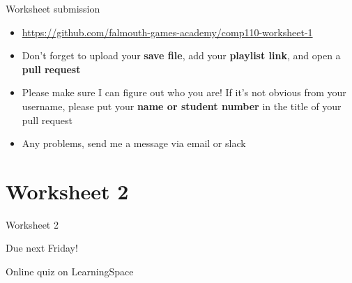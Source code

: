 \begin{frame}{Worksheet submission}
    \begin{itemize}
        \item \url{https://github.com/falmouth-games-academy/comp110-worksheet-1}
        \item Don't forget to upload your \textbf{save file}, add your \textbf{playlist link}, and open a \textbf{pull request}
        \item Please make sure I can figure out who you are!
            If it's not obvious from your username, please put your \textbf{name or student number}
            in the title of your pull request
        \item Any problems, send me a message via email or slack
    \end{itemize}
\end{frame}





\part{Worksheet 2}
\frame{\partpage}

\begin{frame}{Worksheet 2}
  \begin{center}
      Due next Friday!
      
      Online quiz on LearningSpace
  \end{center}
\end{frame}

%



